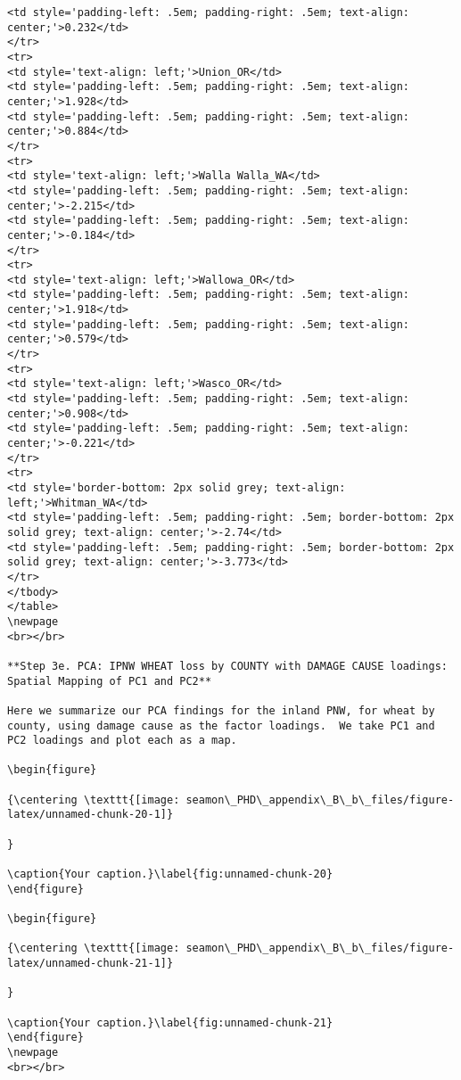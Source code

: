 \documentclass[]{article}
\begin{document}
\begin{verbatim}
<td style='padding-left: .5em; padding-right: .5em; text-align: center;'>0.232</td>
</tr>
<tr>
<td style='text-align: left;'>Union_OR</td>
<td style='padding-left: .5em; padding-right: .5em; text-align: center;'>1.928</td>
<td style='padding-left: .5em; padding-right: .5em; text-align: center;'>0.884</td>
</tr>
<tr>
<td style='text-align: left;'>Walla Walla_WA</td>
<td style='padding-left: .5em; padding-right: .5em; text-align: center;'>-2.215</td>
<td style='padding-left: .5em; padding-right: .5em; text-align: center;'>-0.184</td>
</tr>
<tr>
<td style='text-align: left;'>Wallowa_OR</td>
<td style='padding-left: .5em; padding-right: .5em; text-align: center;'>1.918</td>
<td style='padding-left: .5em; padding-right: .5em; text-align: center;'>0.579</td>
</tr>
<tr>
<td style='text-align: left;'>Wasco_OR</td>
<td style='padding-left: .5em; padding-right: .5em; text-align: center;'>0.908</td>
<td style='padding-left: .5em; padding-right: .5em; text-align: center;'>-0.221</td>
</tr>
<tr>
<td style='border-bottom: 2px solid grey; text-align: left;'>Whitman_WA</td>
<td style='padding-left: .5em; padding-right: .5em; border-bottom: 2px solid grey; text-align: center;'>-2.74</td>
<td style='padding-left: .5em; padding-right: .5em; border-bottom: 2px solid grey; text-align: center;'>-3.773</td>
</tr>
</tbody>
</table>
\newpage
<br></br>

**Step 3e. PCA: IPNW WHEAT loss by COUNTY with DAMAGE CAUSE loadings: Spatial Mapping of PC1 and PC2**

Here we summarize our PCA findings for the inland PNW, for wheat by county, using damage cause as the factor loadings.  We take PC1 and PC2 loadings and plot each as a map.

\begin{figure}

{\centering \texttt{[image: seamon\_PHD\_appendix\_B\_b\_files/figure-latex/unnamed-chunk-20-1]} 

}

\caption{Your caption.}\label{fig:unnamed-chunk-20}
\end{figure}

\begin{figure}

{\centering \texttt{[image: seamon\_PHD\_appendix\_B\_b\_files/figure-latex/unnamed-chunk-21-1]} 

}

\caption{Your caption.}\label{fig:unnamed-chunk-21}
\end{figure}
\newpage
<br></br>


\end{verbatim}
\end{document}
